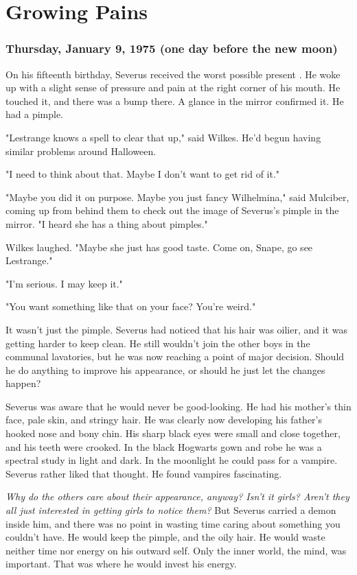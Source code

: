 
\chapter{Growing Pains}

\subsection{Thursday, January 9, 1975 (one day before the new moon)}

On his fifteenth birthday, Severus received the worst possible present . He woke up with a slight sense of pressure and pain at the right corner of his mouth. He touched it, and there was a bump there. A glance in the mirror confirmed it. He had a pimple.

"Lestrange knows a spell to clear that up," said Wilkes. He'd begun having similar problems around Halloween.

"I need to think about that. Maybe I don't want to get rid of it."

"Maybe you did it on purpose. Maybe you just fancy Wilhelmina," said Mulciber, coming up from behind them to check out the image of Severus's pimple in the mirror. "I heard she has a thing about pimples."

Wilkes laughed. "Maybe she just has good taste. Come on, Snape, go see Lestrange."

"I'm serious. I may keep it."

"You want something like that on your face? You're weird."

It wasn't just the pimple. Severus had noticed that his hair was oilier, and it was getting harder to keep clean. He still wouldn't join the other boys in the communal lavatories, but he was now reaching a point of major decision. Should he do anything to improve his appearance, or should he just let the changes happen?

Severus was aware that he would never be good-looking. He had his mother's thin face, pale skin, and stringy hair. He was clearly now developing his father's hooked nose and bony chin. His sharp black eyes were small and close together, and his teeth were crooked. In the black Hogwarts gown and robe he was a spectral study in light and dark. In the moonlight he could pass for a vampire. Severus rather liked that thought. He found vampires fascinating.

\emph{Why do the others care about their appearance, anyway? Isn't it girls? Aren't they all just interested in getting girls to notice them?} But Severus carried a demon inside him, and there was no point in wasting time caring about something you couldn't have. He would keep the pimple, and the oily hair. He would waste neither time nor energy on his outward self. Only the inner world, the mind, was important. That was where he would invest his energy.

